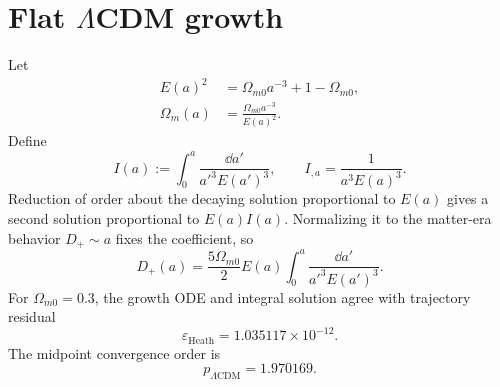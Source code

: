 \section[Flat LambdaCDM growth]{Flat \(\Lambda\)CDM growth}
Let
\begin{align}
E(a)^2&=\Omega_{m0}a^{-3}+1-\Omega_{m0},\\
\Omega_m(a)&=\frac{\Omega_{m0}a^{-3}}{E(a)^2}.
\end{align}
Define
\begin{equation}
I(a):=\int_0^a\frac{\dd a'}{a'^3E(a')^3},
\qquad
I_{,a}=\frac1{a^3E(a)^3}.
\end{equation}
Reduction of order about the decaying solution proportional to \(E(a)\) gives a second solution proportional to \(E(a)I(a)\).  Normalizing it to the matter-era behavior \(D_+\sim a\) fixes the coefficient, so
\begin{equation}
\boxed{
D_+(a)
=\frac{5\Omega_{m0}}{2}
E(a)
\int_0^a\frac{\dd a'}{a'^3E(a')^3}.
}
\end{equation}
For \(\Omega_{m0}=0.3\), the growth ODE and integral solution agree with trajectory residual
\begin{equation}
\varepsilon_{\mathrm{Heath}}
=1.035117\times10^{-12}.
\end{equation}
The midpoint convergence order is
\begin{equation}
p_{\Lambda\mathrm{CDM}}=1.970169.
\end{equation}

